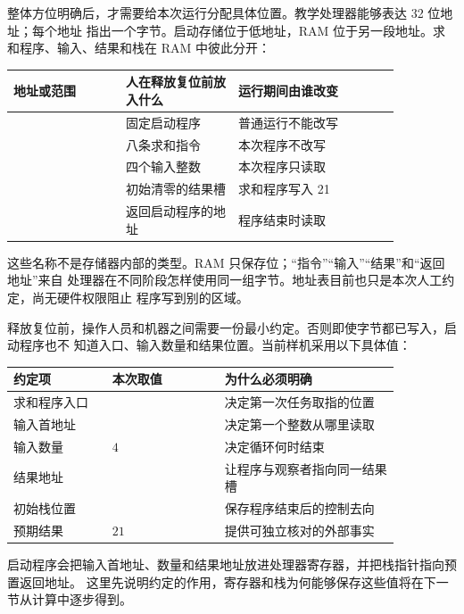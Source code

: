 整体方位明确后，才需要给本次运行分配具体位置。教学处理器能够表达 32 位地址；每个地址
指出一个字节。启动存储位于低地址，RAM 位于另一段地址。求和程序、输入、结果和栈在 RAM
中彼此分开：

\begin{longtable}{|L{0.25\linewidth}|L{0.25\linewidth}|L{0.36\linewidth}|}
\hline
{}
地址或范围 & 人在释放复位前放入什么 & 运行期间由谁改变 \\ \hline
{} & 固定启动程序 & 普通运行不能改写 \\ \hline
{} & 八条求和指令 & 本次程序不改写 \\ \hline
{} & 四个输入整数 & 本次程序只读取 \\ \hline
{} & 初始清零的结果槽 & 求和程序写入 21 \\ \hline
{} & 返回启动程序的地址 & 程序结束时读取 \\ \hline
\end{longtable}

这些名称不是存储器内部的类型。RAM 只保存位；“指令”“输入”“结果”和“返回地址”来自
处理器在不同阶段怎样使用同一组字节。地址表目前也只是本次人工约定，尚无硬件权限阻止
程序写到别的区域。


释放复位前，操作人员和机器之间需要一份最小约定。否则即使字节都已写入，启动程序也不
知道入口、输入数量和结果位置。当前样机采用以下具体值：

\begin{longtable}{|L{0.22\linewidth}|L{0.25\linewidth}|L{0.39\linewidth}|}
\hline
{}
约定项 & 本次取值 & 为什么必须明确 \\ \hline
求和程序入口 &  & 决定第一次任务取指的位置 \\ \hline
输入首地址 &  & 决定第一个整数从哪里读取 \\ \hline
输入数量 & \(4\) & 决定循环何时结束 \\ \hline
结果地址 &  & 让程序与观察者指向同一结果槽 \\ \hline
初始栈位置 &  & 保存程序结束后的控制去向 \\ \hline
预期结果 & \(21\) & 提供可独立核对的外部事实 \\ \hline
\end{longtable}

启动程序会把输入首地址、数量和结果地址放进处理器寄存器，并把栈指针指向预置返回地址。
这里先说明约定的作用，寄存器和栈为何能够保存这些值将在下一节从计算中逐步得到。


